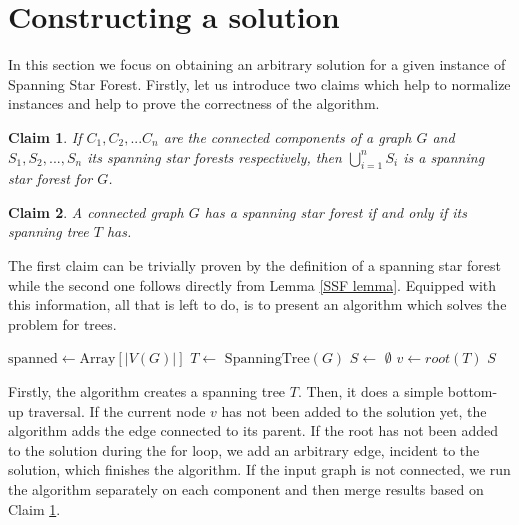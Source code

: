 \documentclass[en]{pracamgr}
\newtheorem{claim}{Claim}
\newcommand{\ssf}{spanning star forest}
\newcommand{\ssfp}{{\sc Spanning Star Forest}}
\begin{document}
\section{Constructing a solution}

In this section we focus on obtaining an arbitrary solution for a given instance of \ssfp{}. Firstly, let us introduce two claims which help to normalize instances and help to prove the correctness of the algorithm.

\begin{claim} \label{SSF sum}
	If $C_1,C_2,...C_n$ are the connected components of a graph $G$ and $S_1,S_2,...,S_n$ its \ssf{}s respectively, then $\bigcup\limits_{i=1}^n S_i$ is a \ssf{} for $G$.
\end{claim}

\begin{claim} \label{Spanning tree SSF}
	A connected graph $G$ has a \ssf{} if and only if its spanning tree $T$ has.
\end{claim}

The first claim can be trivially proven by the definition of a \ssf{} while the second one follows directly from Lemma \ref{SSF lemma}. Equipped with this information, all that is left to do, is to present an algorithm which solves the problem for trees.

\begin{algorithm}\label{alg1}
	\KwOut{\ssf{} of $G$}
	$\textrm{spanned} \leftarrow \textrm{Array}[|V(G)|]$\; 
	$T \leftarrow$ $\textrm{SpanningTree}(G)$\;
	$S \leftarrow$ $\emptyset$\;
	$v \leftarrow root(T)$\;
	\Return $S$\;
	\caption{Obtaining a spanning star forest from a connected graph.}
\end{algorithm}

Firstly, the algorithm creates a spanning tree $T$. Then, it does a simple bottom-up traversal. If the current node $v$ has not been added to the solution yet, the algorithm adds the edge connected to its parent. If the root has not been added to the solution during the for loop, we add an arbitrary edge, incident to the solution, which finishes the algorithm. If the input graph is not connected, we run the algorithm separately on each component and then merge results based on Claim \ref{SSF sum}.
\end{document}

